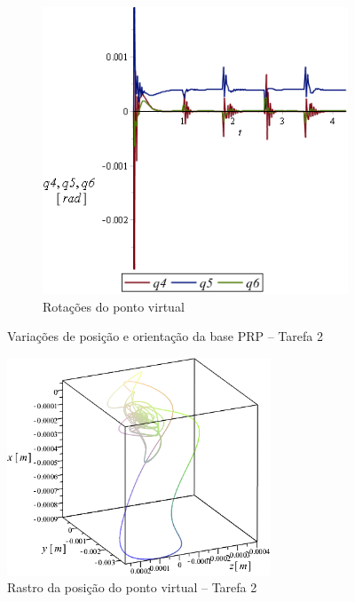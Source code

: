 \begin{figure}[h]
\begin{subfigure}[b]{0.48\textwidth}
        \includegraphics[width=\textwidth]{figs/t2_q456_base_prp}
        \caption{Rotações do ponto virtual}
        \label{fig::t2_q456_base_prp}
    \end{subfigure}
    \caption{Variações de posição e orientação da base PRP -- Tarefa 2}
    \label{fig::t2_q123456_base_prp}
\end{figure}

\begin{figure}[h!]
	\centering 
 	\includegraphics[width=0.70\textwidth]{figs/t2_pvirtural_base_prp}
 	\caption{Rastro da posição do ponto virtual -- Tarefa 2}
 	\label{fig::t2_pvirtural_base_prp}
\end{figure}


